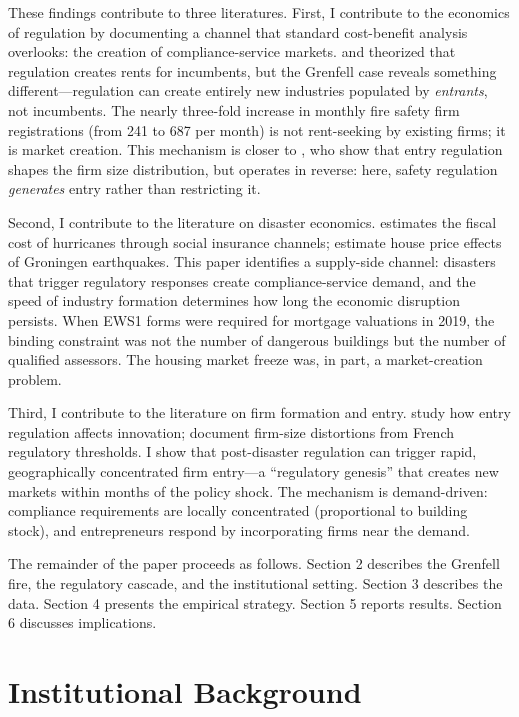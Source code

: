 \documentclass[12pt]{article}
\begin{document}
These findings contribute to three literatures. First, I contribute to the economics of regulation by documenting a channel that standard cost-benefit analysis overlooks: the creation of compliance-service markets. \citet{stigler_1971} and \citet{peltzman_1976} theorized that regulation creates rents for incumbents, but the Grenfell case reveals something different---regulation can create entirely new industries populated by \textit{entrants}, not incumbents. The nearly three-fold increase in monthly fire safety firm registrations (from 241 to 687 per month) is not rent-seeking by existing firms; it is market creation. This mechanism is closer to \citet{djankov_etal_2002}, who show that entry regulation shapes the firm size distribution, but operates in reverse: here, safety regulation \textit{generates} entry rather than restricting it.

Second, I contribute to the literature on disaster economics. \citet{deryugina_2017} estimates the fiscal cost of hurricanes through social insurance channels; \citet{koster_vanommeren_2015} estimate house price effects of Groningen earthquakes. This paper identifies a supply-side channel: disasters that trigger regulatory responses create compliance-service demand, and the speed of industry formation determines how long the economic disruption persists. When EWS1 forms were required for mortgage valuations in 2019, the binding constraint was not the number of dangerous buildings but the number of qualified assessors. The housing market freeze was, in part, a market-creation problem.

Third, I contribute to the literature on firm formation and entry. \citet{aghion_etal_2021} study how entry regulation affects innovation; \citet{garicano_etal_2016} document firm-size distortions from French regulatory thresholds. I show that post-disaster regulation can trigger rapid, geographically concentrated firm entry---a ``regulatory genesis'' that creates new markets within months of the policy shock. The mechanism is demand-driven: compliance requirements are locally concentrated (proportional to building stock), and entrepreneurs respond by incorporating firms near the demand.

The remainder of the paper proceeds as follows. Section 2 describes the Grenfell fire, the regulatory cascade, and the institutional setting. Section 3 describes the data. Section 4 presents the empirical strategy. Section 5 reports results. Section 6 discusses implications.


\section{Institutional Background}
\end{document}
